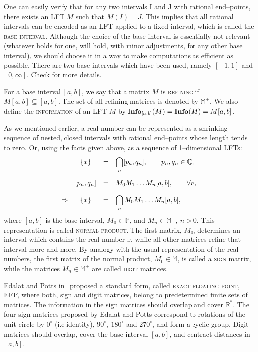 \documentclass[11pt,a4paper]{article}
\begin{document}
One can easily verify that for any two intervals I and J with rational
	end--points, there exists an LFT $M$ such that $M(I) = J$. This implies
	that all rational intervals can be encoded as an LFT applied to a
	fixed interval, which is called the \textsc{base interval}. Although
	the choice of the base interval is essentially not relevant (whatever
	holds for one, will hold, with minor adjustments, for any other
	base interval), we should choose it in a way to make computations
	as efficient as possible. There are two base intervals which have
	been used, namely $[-1,1]$ and $[0,\infty]$. Check \cite{eda97,
	edapot97, pot98, hec99} for more details.

For a base interval $[a,b]$, we say that a matrix $M$ is \textsc{refining}
	if $M[a,b] \subseteq [a,b]$. The set of all refining matrices is
	denoted by $\mathbb{M}^+$. We also define the \textsc{information} of
	an LFT $M$ by $\textbf{Info}_{[a,b]}(M) = {\bf Info}(M)=M[a,b]$.

As we mentioned earlier, a real number can be represented as a
	shrinking sequence of nested, closed intervals with rational
	end--points whose length tends to zero. Or, using the facts given
	above, as a sequence of 1--dimensional LFTs:
	\[ \begin{array}{rccl}
		& \{ x \}  &=& \displaystyle{ \bigcap_n [p_n,q_n],
			\qquad p_n,q_n \in \mathbb{Q}, } \vspace{1em} \\
		& [p_n,q_n] &=& \displaystyle{ M_0 M_1 \ldots M_n [a,b],
			\qquad \forall n, } \vspace{1em} \\
		\Rightarrow & \{ x \}  &=& \displaystyle{ \bigcap_n M_0 M_1
			\ldots M_n [a,b], }
	\end{array} \]
	where $[a,b]$ is the base interval, $M_0 \in \mathbb{M}$, and
	$M_n \in \mathbb{M}^+,\ n>0$. This representation is called
	\textsc{normal product}. The first matrix, $M_0$, determines an
	interval which contains the real number $x$, while all other matrices
	refine that interval more and more. By analogy with the usual
	representation of the real numbers, the first matrix of the normal
	product, $M_0 \in \mathbb{M}$, is called a \textsc{sign} matrix,
	while the matrices $M_n \in \mathbb{M}^+$ are called \textsc{digit}
	matrices.

	Edalat and Potts in~\cite{eda97,edapot97} proposed a standard form,
	called \textsc{exact floating point}, EFP, where both, sign and digit
	matrices, belong to predetermined finite sets of matrices. The
	information in the sign matrices should overlap and cover
	$\mathbb{R}^*$. The four sign matrices proposed by Edalat and Potts
	correspond to rotations of the unit circle by $0^\circ$ (i.e identity), 
	$90^\circ, \ 180^\circ$ and $270^\circ$, and form a cyclic group.
	Digit matrices should overlap, cover the base interval $[a,b]$, and
	contract distances in $[a,b]$.
\end{document}
